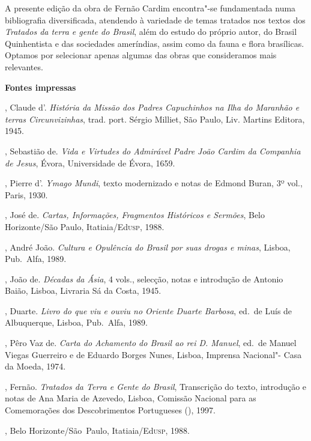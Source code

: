\begin{bibliohedra} 
\item A presente edição da obra de Fernão Cardim encontra"-se fundamentada
numa bibliografia diversificada, atendendo à variedade de temas
tratados nos textos dos \textit{Tratados da terra e gente do Brasil}, 
além do estudo do próprio autor, do Brasil Quinhentista e das
sociedades ameríndias, assim como da fauna e flora brasílicas. Optamos
por selecionar apenas algumas das obras que consideramos mais relevantes.

\vspace*{2ex}
\scriptsize\textbf{Fontes impressas}

, Claude d'. \textit{História da Missão dos Padres
Capuchinhos na Ilha do Maranhão e terras Circunvizinhas}, trad. port.
Sérgio Milliet, São Paulo, Liv. Martins Editora, 1945.

, Sebastião de. \textit{Vida e Virtudes do Admirável Padre João
Cardim da Companhia de Jesus}, Évora, Universidade de Évora, 1659.

, Pierre d'. \textit{Ymago Mundi}, texto modernizado e notas de
Edmond Buran, 3º vol., Paris, 1930.

, José de. \textit{Cartas, Informações, Fragmentos Históricos
e Sermões}, Belo Horizonte/São Paulo, Itatiaia/Ed\textsc{usp}, 1988.

, André João. \textit{Cultura e Opulência do Brasil por suas
drogas e minas}, Lisboa, Pub.~Alfa, 1989.

, João de. \textit{Décadas da Ásia}, 4 vols., selecção, notas e
introdução de Antonio Baião, Lisboa, Livraria Sá da Costa, 1945.

, Duarte. \textit{Livro do que viu e ouviu no Oriente Duarte
Barbosa}, ed.~de Luís de Albuquerque, Lisboa, Pub.~Alfa, 1989.

, Pêro Vaz de. \textit{Carta do Achamento do Brasil ao rei D.
Manuel}, ed.~de Manuel Viegas Guerreiro e de Eduardo Borges Nunes,
Lisboa, Imprensa Nacional"- Casa da Moeda, 1974.

, Fernão. \textit{Tratados da Terra e Gente do Brasil}, Transcrição do texto, introdução e notas de Ana Maria de Azevedo, Lisboa, Comissão Nacional para as Comemorações dos Descobrimentos Portugueses (), 1997.

, Belo Horizonte/São~Paulo, Itatiaia/Ed\textsc{usp}, 1988.


\end{bibliohedra}
